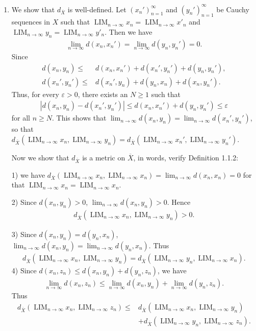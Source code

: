 \documentclass{book}
\DeclareMathOperator{\tlim}{LIM}%
\begin{document}
\begin{enumerate}
    \item We show that $d_{\overline X}$ is well-defined. Let $(x_n')_{n=1}^{\infty}$ and $(y_n')_{n=1}^{\infty}$ be Cauchy sequences in $X$ such that $\tlim_{n\to\infty}x_n=\tlim_{n\to\infty}x'_n$ and $\tlim_{n\to\infty}y_n=\tlim_{n\to\infty}y'_n$. Then we have
        \begin{align*}
            \lim_{n\to\infty}d(x_n,x_n')=\lim_{n\to\infty}d(y_n,y_n')=0.
        \end{align*}
    Since
        \begin{align*}
            d(x_n,y_n)\leq &d(x_n,x_n')+d(x_n',y_n')+d(y_n,y_n'),\\
            d(x_n',y_n')\leq &d(x_n',y_n)+d(y_n,x_n)+d(x_n,y_n').
        \end{align*}
    Thus, for every $\varepsilon>0$, there exists an $N\geq 1$ such that
        \begin{align*}
            |d(x_n,y_n)-d(x_n',y_n')|\leq d(x_n,x_n')+d(y_n,y_n')\leq\varepsilon
        \end{align*}
    for all $n\geq N$. This shows that $\lim_{n\to\infty}d(x_n,y_n)=\lim_{n\to\infty}d(x_n',y_n')$, so that $d_{\overline X}(\tlim_{n\to\infty}x_n,\tlim_{n\to\infty}y_n)=d_{\overline X}(\tlim_{n\to\infty}x_n',\tlim_{n\to\infty}y_n')$.

    Now we show that $d_{\overline X}$ is a metric on $\overline X$, in words, verify Definition 1.1.2:
    
    1) we have $d_{\overline X}(\tlim_{n\to\infty}x_n,\tlim_{n\to\infty}x_n)=\lim_{n\to\infty}d(x_n,x_n)=0$ for that $\tlim_{n\to\infty}x_n=\tlim_{n\to\infty}x_n$.
    
    2) Since $d(x_n,y_n)>0$, $\lim_{n\to\infty}d(x_n,y_n)>0$. Hence
        \begin{align*}
            d_{\overline X}(\tlim_{n\to\infty}x_n,\tlim_{n\to\infty}y_n)>0.
        \end{align*}
    
    3) Since $d(x_n,y_n)=d(y_n,x_n)$, $\lim_{n\to\infty}d(x_n,y_n)=\lim_{n\to\infty}d(y_n,x_n)$. Thus
        \begin{align*}
            d_{\overline X}(\tlim_{n\to\infty}x_n,\tlim_{n\to\infty}y_n)=d_{\overline X}(\tlim_{n\to\infty}y_n,\tlim_{n\to\infty}x_n).
        \end{align*}
    4) Since $d(x_n,z_n)\leq d(x_n,y_n)+d(y_n,z_n)$, we have
        \begin{align*}
            \lim_{n\to\infty}d(x_n,z_n)\leq\lim_{n\to\infty}d(x_n,y_n)+\lim_{n\to\infty}d(y_n,z_n).
        \end{align*}
    Thus
        \begin{align*}
            d_{\overline X}(\tlim_{n\to\infty}x_n,\tlim_{n\to\infty}z_n)
            \leq& d_{\overline X}(\tlim_{n\to\infty}x_n,\tlim_{n\to\infty}y_n)\\
            &+d_{\overline X}(\tlim_{n\to\infty}y_n,\tlim_{n\to\infty}z_n).
        \end{align*}


\end{enumerate}
\end{document}
